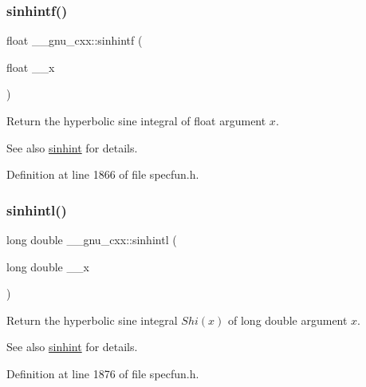 \subsubsection{\texorpdfstring{sinhintf()}{sinhintf()}}
{\footnotesize\ttfamily float \+\_\+\+\_\+gnu\+\_\+cxx\+::sinhintf (\begin{DoxyParamCaption}\item[{float}]{\+\_\+\+\_\+x }\end{DoxyParamCaption})\hspace{0.3cm}{\ttfamily [inline]}}

Return the hyperbolic sine integral of {\ttfamily float} argument $ x $.

\begin{DoxySeeAlso}{See also}
\hyperlink{group__gnu__math__spec__func_gab5cbc831c5fab99a967c03d059f1ad59}{sinhint} for details. 
\end{DoxySeeAlso}


Definition at line 1866 of file specfun.\+h.

\mbox{\label{group__gnu__math__spec__func_ga8b7f1a070be7233a3179e3cbded387ee}} 
\subsubsection{\texorpdfstring{sinhintl()}{sinhintl()}}
{\footnotesize\ttfamily long double \+\_\+\+\_\+gnu\+\_\+cxx\+::sinhintl (\begin{DoxyParamCaption}\item[{long double}]{\+\_\+\+\_\+x }\end{DoxyParamCaption})\hspace{0.3cm}{\ttfamily [inline]}}

Return the hyperbolic sine integral $ Shi(x) $ of {\ttfamily long double} argument $ x $.

\begin{DoxySeeAlso}{See also}
\hyperlink{group__gnu__math__spec__func_gab5cbc831c5fab99a967c03d059f1ad59}{sinhint} for details. 
\end{DoxySeeAlso}


Definition at line 1876 of file specfun.\+h.

\mbox{\label{group__gnu__math__spec__func_ga076c8d52588904f5711c41781f8acfa0}} 
